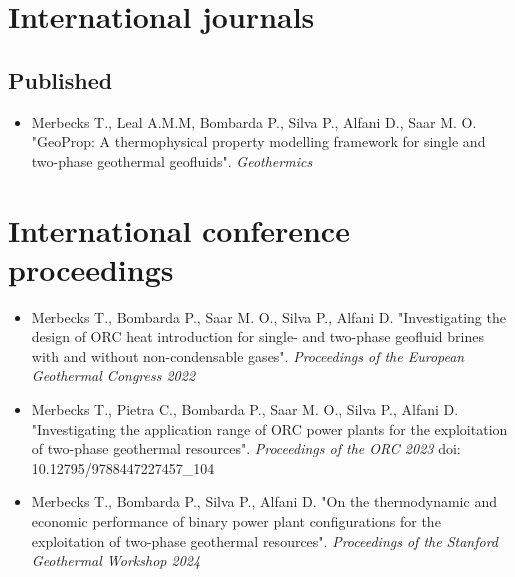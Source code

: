 \section*{International journals}
    \subsection*{Published}
    \begin{itemize}
        \item Merbecks T., Leal A.M.M, Bombarda P., Silva P., Alfani D., Saar M. O. "GeoProp: A thermophysical property modelling framework for single and two-phase geothermal geofluids". \textit{Geothermics} 
    \end{itemize}


\section*{International conference proceedings}
    \begin{itemize}
        \item Merbecks T., Bombarda P., Saar M. O., Silva P., Alfani D. "Investigating the design of ORC heat introduction for single- and two-phase geofluid brines with and without non-condensable gases". \textit{Proceedings of the European Geothermal Congress 2022}
        \item Merbecks T., Pietra C., Bombarda P., Saar M. O., Silva P., Alfani D. "Investigating the application range of ORC power plants for the exploitation of two-phase geothermal resources". \textit{Proceedings of the ORC 2023} doi: 10.12795/9788447227457\_104
        
        \item Merbecks T., Bombarda P., Silva P., Alfani D. "On the thermodynamic and economic performance of binary power plant configurations for the exploitation of two-phase geothermal resources". \textit{Proceedings of the Stanford Geothermal Workshop 2024}
    \end{itemize}

